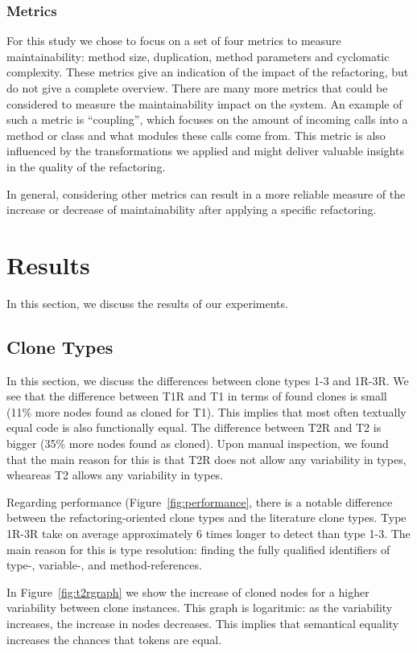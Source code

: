 \subsubsection{Metrics}
For this study we chose to focus on a set of four metrics to measure maintainability: method size, duplication, method parameters and cyclomatic complexity. These metrics give an indication of the impact of the refactoring, but do not give a complete overview. There are many more metrics that could be considered to measure the maintainability impact on the system. An example of such a metric is ``coupling'', which focuses on the amount of incoming calls into a method or class and what modules these calls come from. This metric is also influenced by the transformations we applied and might deliver valuable insights in the quality of the refactoring.

In general, considering other metrics can result in a more reliable measure of the increase or decrease of maintainability after applying a specific refactoring.

\section{Results}
In this section, we discuss the results of our experiments.

\subsection{Clone Types}
In this section, we discuss the differences between clone types 1-3 and 1R-3R. We see that the difference between T1R and T1 in terms of found clones is small (11\% more nodes found as cloned for T1). This implies that most often textually equal code is also functionally equal. The difference between T2R and T2 is bigger (35\% more nodes found as cloned). Upon manual inspection, we found that the main reason for this is that T2R does not allow any variability in types, wheareas T2 allows any variability in types.

Regarding performance (Figure~\ref{fig:performance}, there is a notable difference between the refactoring-oriented clone types and the literature clone types. Type 1R-3R take on average approximately 6 times longer to detect than type 1-3. The main reason for this is type resolution: finding the fully qualified identifiers of type-, variable-, and method-references.

In Figure~\ref{fig:t2rgraph} we show the increase of cloned nodes for a higher variability between clone instances. This graph is logaritmic: as the variability increases, the increase in nodes decreases. This implies that semantical equality increases the chances that tokens are equal.

